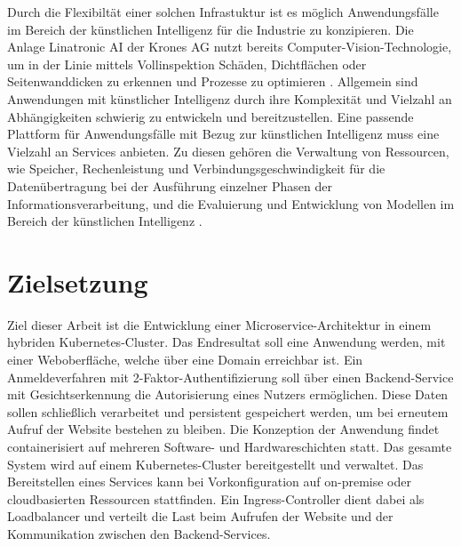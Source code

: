 Durch die Flexibiltät einer solchen Infrastuktur ist es möglich Anwendungsfälle im Bereich
der künstlichen Intelligenz
für die Industrie zu konzipieren. Die Anlage Linatronic AI der Krones AG nutzt bereits Computer-Vision-Technologie,
um in der Linie mittels Vollinspektion Schäden, Dichtflächen oder Seitenwanddicken
zu erkennen und Prozesse zu optimieren \cite{linatronic}. Allgemein sind Anwendungen mit künstlicher Intelligenz durch ihre Komplexität
und Vielzahl an Abhängigkeiten schwierig zu entwickeln und bereitzustellen. 
Eine passende Plattform für Anwendungsfälle mit Bezug zur künstlichen Intelligenz
muss eine Vielzahl an Services anbieten. Zu diesen gehören die Verwaltung von Ressourcen, wie Speicher,
Rechenleistung und Verbindungsgeschwindigkeit
für die Datenübertragung bei der Ausführung einzelner Phasen der Informationsverarbeitung, und die Evaluierung und Entwicklung von Modellen
im Bereich der künstlichen Intelligenz \cite{mlops}. 

\section{Zielsetzung}
Ziel dieser Arbeit ist die Entwicklung einer Microservice-Architektur in einem hybriden Kubernetes-Cluster. 
Das Endresultat soll eine Anwendung werden, mit einer Weboberfläche, welche über eine Domain erreichbar ist.
Ein Anmeldeverfahren mit 2-Faktor-Authentifizierung soll über einen Backend-Service mit Gesichtserkennung die Autorisierung eines Nutzers ermöglichen.
Diese Daten sollen schließlich verarbeitet und persistent 
gespeichert werden, um bei erneutem Aufruf der Website bestehen zu bleiben.
Die Konzeption der Anwendung findet containerisiert auf mehreren Software- und Hardwareschichten
statt. 
Das gesamte System wird auf einem Kubernetes-Cluster bereitgestellt und verwaltet.
Das Bereitstellen eines Services kann bei Vorkonfiguration auf on-premise oder cloudbasierten Ressourcen stattfinden.
Ein Ingress-Controller dient dabei als Loadbalancer und verteilt die Last beim 
Aufrufen der Website und der Kommunikation zwischen den Backend-Services.

